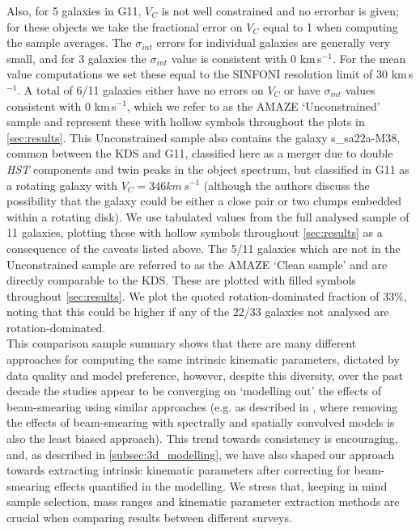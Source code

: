 \documentclass[fleqn,usenatbib]{mnras}
\begin{document}
\noindent
Also, for 5 galaxies in G11, $V_{C}$ is not well constrained and no errorbar is given; for these objects we take the fractional error on $V_{C}$ equal to 1 when computing the sample averages.
The $\sigma_{int}$ errors for individual galaxies are generally very small, and for 3 galaxies the $\sigma_{int}$ value is consistent with 0 km\,s$^{-1}$.
For the mean value computations we set these equal to the SINFONI resolution limit of 30 km\,s$^{-1}$.
A total of 6/11 galaxies either have no errors on $V_{C}$ or have $\sigma_{int}$ values consistent with 0 km\,s$^{-1}$, which we refer to as the AMAZE `Unconstrained' sample and represent these with hollow symbols throughout the plots in \cref{sec:results}.
This Unconstrained sample also contains the galaxy s\_sa22a-M38, common between the KDS and G11, classified here as a merger due to double {\em HST} components and twin peaks in the object spectrum, but classified in G11 as a rotating galaxy with $V_{C} = 346 km\,s^{-1}$ (although the authors discuss the possibility that the galaxy could be either a close pair or two clumps embedded within a rotating disk).
We use tabulated values from the full analysed sample of 11 galaxies, plotting these with hollow symbols throughout \cref{sec:results} as a consequence of the caveats listed above.
The 5/11 galaxies which are not in the Unconstrained sample are referred to as the AMAZE `Clean sample' and are directly comparable to the KDS.
These are plotted with filled symbols throughout \cref{sec:results}.
We plot the quoted rotation-dominated fraction of 33$\%$, noting that this could be higher if any of the 22/33 galaxies not analysed are rotation-dominated. \\

\noindent
This comparison sample summary shows that there are many different approaches for computing the same intrinsic kinematic parameters, dictated by data quality and model preference, however, despite this diversity, over the past decade the studies appear to be converging on `modelling out' the effects of beam-smearing using similar approaches (e.g. as described in \citealt{Davies2011}, where removing the effects of beam-smearing with spectrally and spatially convolved models is also the least biased approach).
This trend towards consistency is encouraging, and, as described in \cref{subsec:3d_modelling}, we have also shaped our approach towards extracting intrinsic kinematic parameters after correcting for beam-smearing effects quantified in the modelling.
We stress that, keeping in mind sample selection, mass ranges and kinematic parameter extraction methods are crucial when comparing results between different surveys.
\end{document}

